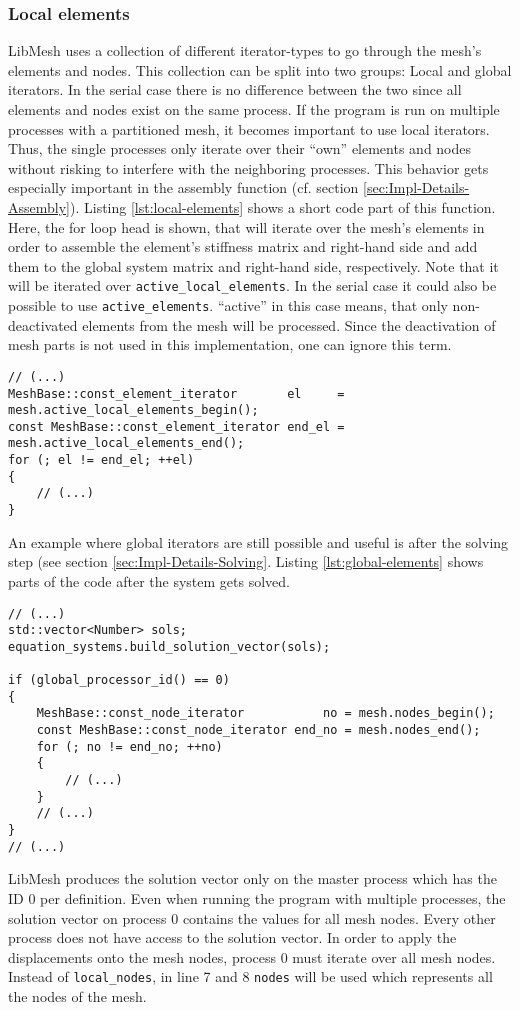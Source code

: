   
  \subsubsection{Local elements}
   LibMesh uses a collection of different iterator-types to go through the mesh's elements and nodes. This collection can be split into two groups: Local and global iterators. In the serial case there is no difference between the two since all elements and nodes exist on the same process. If the program is run on multiple processes with a partitioned mesh, it becomes important to use local iterators. Thus, the single processes only iterate over their ``own'' elements and nodes without risking to interfere with the neighboring processes. This behavior gets especially important in the assembly function (cf. section \ref{sec:Impl-Details-Assembly}). Listing \ref{lst:local-elements} shows a short code part of this function. Here, the for loop head is shown, that will iterate over the mesh's elements in order to assemble the element's stiffness matrix and right-hand side and add them to the global system matrix and right-hand side, respectively. Note that it will be iterated over \texttt{active\_local\_elements}. In the serial case it could also be possible to use \texttt{active\_elements}. ``active'' in this case means, that only non-deactivated elements from the mesh will be processed. Since the deactivation of mesh parts is not used in this implementation, one can ignore this term.
\begin{lstlisting}[caption=Local elements iterator,label=lst:local-elements,keepspaces=true]
// (...)
MeshBase::const_element_iterator       el     = mesh.active_local_elements_begin();
const MeshBase::const_element_iterator end_el = mesh.active_local_elements_end();
for (; el != end_el; ++el)
{
	// (...)
}
\end{lstlisting}
   An example where global iterators are still possible and useful is after the solving step (see section \ref{sec:Impl-Details-Solving}. Listing \ref{lst:global-elements} shows parts of the code after the system gets solved.
\begin{lstlisting}[caption=Global nodes iterator,label=lst:global-elements,keepspaces=true]
// (...)
std::vector<Number> sols;
equation_systems.build_solution_vector(sols);

if (global_processor_id() == 0)
{
	MeshBase::const_node_iterator           no = mesh.nodes_begin();
	const MeshBase::const_node_iterator end_no = mesh.nodes_end();
	for (; no != end_no; ++no)
	{
		// (...)
	}
	// (...)
}
// (...)
\end{lstlisting}
   LibMesh produces the solution vector only on the master process which has the ID $0$ per definition. Even when running the program with multiple processes, the solution vector on process 0 contains the values for all mesh nodes. Every other process does not have access to the solution vector. In order to apply the displacements onto the mesh nodes, process 0 must iterate over all mesh nodes. Instead of \texttt{local\_nodes}, in line 7 and 8 \texttt{nodes} will be used which represents all the nodes of the mesh.
  
